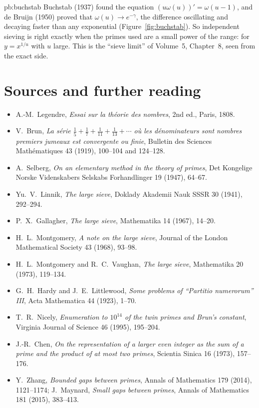 \begin{solution}{pb:buchstab}
\leads Buchstab (1937) found the equation $(u\omega(u))'=\omega(u-1)$, and de Bruijn (1950) proved that $\omega(u)\to e^{-\gamma}$, the difference oscillating and decaying faster than any exponential
(Figure~\ref{fig:buchstab}). So independent sieving is right exactly when the primes used are a small power of the range: for $y=x^{1/u}$ with $u$ large. This is the ``sieve limit'' of Volume~5,
Chapter~8, seen from the exact side.
\end{solution}

\section*{Sources and further reading}

\begin{itemize}
\item A.-M.~Legendre, \emph{Essai sur la théorie des nombres}, 2nd ed., Paris, 1808.
\item V.~Brun, \emph{La série $\frac15+\frac17+\frac1{11}+\frac1{13}+\cdots$ où les dénominateurs sont nombres premiers jumeaux est convergente ou finie}, Bulletin des Sciences Mathématiques 43 (1919), 100--104 and 124--128.
\item A.~Selberg, \emph{On an elementary method in the theory of primes}, Det Kongelige Norske Videnskabers Selskabs Forhandlinger 19 (1947), 64--67.
\item Yu.~V.~Linnik, \emph{The large sieve}, Doklady Akademii Nauk SSSR 30 (1941), 292--294.
\item P.~X.~Gallagher, \emph{The large sieve}, Mathematika 14 (1967), 14--20.
\item H.~L.~Montgomery, \emph{A note on the large sieve}, Journal of the London Mathematical Society 43 (1968), 93--98.
\item H.~L.~Montgomery and R.~C.~Vaughan, \emph{The large sieve}, Mathematika 20 (1973), 119--134.
\item G.~H.~Hardy and J.~E.~Littlewood, \emph{Some problems of ``Partitio numerorum'' III}, Acta Mathematica 44 (1923), 1--70.
\item T.~R.~Nicely, \emph{Enumeration to $10^{14}$ of the twin primes and Brun's constant}, Virginia Journal of Science 46 (1995), 195--204.
\item J.-R.~Chen, \emph{On the representation of a larger even integer as the sum of a prime and the product of at most two primes}, Scientia Sinica 16 (1973), 157--176.
\item Y.~Zhang, \emph{Bounded gaps between primes}, Annals of Mathematics 179 (2014), 1121--1174; J.~Maynard, \emph{Small gaps between primes}, Annals of Mathematics 181 (2015), 383--413.

\end{itemize}
